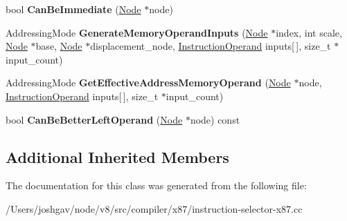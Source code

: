 \begin{DoxyCompactItemize}
\item 
bool {\bfseries Can\+Be\+Immediate} (\hyperlink{classv8_1_1internal_1_1compiler_1_1_node}{Node} $\ast$node)\hypertarget{classv8_1_1internal_1_1compiler_1_1_x87_operand_generator_a3e42fba1bacf606bd6a7b0e917cfaf73}{}\label{classv8_1_1internal_1_1compiler_1_1_x87_operand_generator_a3e42fba1bacf606bd6a7b0e917cfaf73}

\item 
Addressing\+Mode {\bfseries Generate\+Memory\+Operand\+Inputs} (\hyperlink{classv8_1_1internal_1_1compiler_1_1_node}{Node} $\ast$index, int scale, \hyperlink{classv8_1_1internal_1_1compiler_1_1_node}{Node} $\ast$base, \hyperlink{classv8_1_1internal_1_1compiler_1_1_node}{Node} $\ast$displacement\+\_\+node, \hyperlink{classv8_1_1internal_1_1compiler_1_1_instruction_operand}{Instruction\+Operand} inputs\mbox{[}$\,$\mbox{]}, size\+\_\+t $\ast$input\+\_\+count)\hypertarget{classv8_1_1internal_1_1compiler_1_1_x87_operand_generator_a0e3448cc9aab4a93c4b717e9de7458a8}{}\label{classv8_1_1internal_1_1compiler_1_1_x87_operand_generator_a0e3448cc9aab4a93c4b717e9de7458a8}

\item 
Addressing\+Mode {\bfseries Get\+Effective\+Address\+Memory\+Operand} (\hyperlink{classv8_1_1internal_1_1compiler_1_1_node}{Node} $\ast$node, \hyperlink{classv8_1_1internal_1_1compiler_1_1_instruction_operand}{Instruction\+Operand} inputs\mbox{[}$\,$\mbox{]}, size\+\_\+t $\ast$input\+\_\+count)\hypertarget{classv8_1_1internal_1_1compiler_1_1_x87_operand_generator_ad6cc1c5eed1bd34f1633212227ae274e}{}\label{classv8_1_1internal_1_1compiler_1_1_x87_operand_generator_ad6cc1c5eed1bd34f1633212227ae274e}

\item 
bool {\bfseries Can\+Be\+Better\+Left\+Operand} (\hyperlink{classv8_1_1internal_1_1compiler_1_1_node}{Node} $\ast$node) const \hypertarget{classv8_1_1internal_1_1compiler_1_1_x87_operand_generator_ae9615c05f71e0abb82d2e42d0b707e04}{}\label{classv8_1_1internal_1_1compiler_1_1_x87_operand_generator_ae9615c05f71e0abb82d2e42d0b707e04}

\end{DoxyCompactItemize}
\subsection*{Additional Inherited Members}


The documentation for this class was generated from the following file\+:\begin{DoxyCompactItemize}
\item 
/\+Users/joshgav/node/v8/src/compiler/x87/instruction-\/selector-\/x87.\+cc\end{DoxyCompactItemize}
